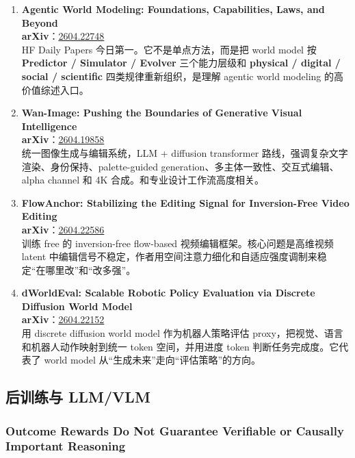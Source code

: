 \begin{enumerate}[leftmargin=1.5em]
  \item \textbf{Agentic World Modeling: Foundations, Capabilities, Laws, and Beyond}\\
  \textbf{arXiv}：\href{https://arxiv.org/abs/2604.22748}{2604.22748}\\
  HF Daily Papers 今日第一。它不是单点方法，而是把 world model 按 \textbf{Predictor / Simulator / Evolver} 三个能力层级和 \textbf{physical / digital / social / scientific} 四类规律重新组织，是理解 agentic world modeling 的高价值综述入口。

  \item \textbf{Wan-Image: Pushing the Boundaries of Generative Visual Intelligence}\\
  \textbf{arXiv}：\href{https://arxiv.org/abs/2604.19858}{2604.19858}\\
  统一图像生成与编辑系统，LLM + diffusion transformer 路线，强调复杂文字渲染、身份保持、palette-guided generation、多主体一致性、交互式编辑、alpha channel 和 4K 合成。和专业设计工作流高度相关。

  \item \textbf{FlowAnchor: Stabilizing the Editing Signal for Inversion-Free Video Editing}\\
  \textbf{arXiv}：\href{https://arxiv.org/abs/2604.22586}{2604.22586}\\
  训练 free 的 inversion-free flow-based 视频编辑框架。核心问题是高维视频 latent 中编辑信号不稳定，作者用空间注意力细化和自适应强度调制来稳定“在哪里改”和“改多强”。

  \item \textbf{dWorldEval: Scalable Robotic Policy Evaluation via Discrete Diffusion World Model}\\
  \textbf{arXiv}：\href{https://arxiv.org/abs/2604.22152}{2604.22152}\\
  用 discrete diffusion world model 作为机器人策略评估 proxy，把视觉、语言和机器人动作映射到统一 token 空间，并用进度 token 判断任务完成度。它代表了 world model 从“生成未来”走向“评估策略”的方向。
\end{enumerate}

\subsection{后训练与 LLM/VLM}

\subsubsection{Outcome Rewards Do Not Guarantee Verifiable or Causally Important Reasoning}

